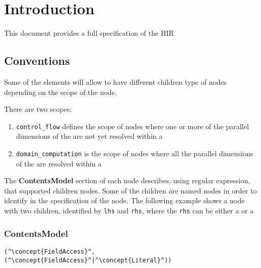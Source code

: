 \section{Introduction}


This document provides a full specification of the HIR

\subsection{Conventions}

Some of the elements will allow to have different children type of nodes depending on the scope of the node.

There are two scopes: 
\begin{enumerate}
	\item {\tt control\_flow} defines the scope of nodes where one or more of the parallel dimensions of the  are not yet resolved within a 
	\item {\tt domain\_computation} is the scope of nodes where all the parallel dimensions of the  are resolved within a 
\end{enumerate}

The {\bf ContentsModel} section of each node describes, using regular expression, that supported children nodes. 
Some of the children are named nodes in order to identify in the specification of the node. The following example shows
a node with two children, identified by {\tt lhs} and {\tt rhs}, where the {\tt rhs} can be either a  or a  

\subsubsection*{ContentsModel}{}

\begin{lstlisting}[style=default,frame=none]
(^\concept{FieldAccess}^, (^\concept{FieldAccess}^|^\concept{Literal}^))
\end{lstlisting}
